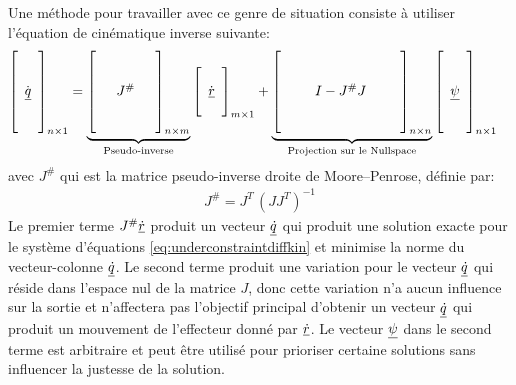 Une méthode pour travailler avec ce genre de situation consiste à utiliser l'équation de cinématique inverse suivante:
\begin{align}
\left[ \begin{array}{c}  \\ \\ \dot{\underline{q}} \\ \\ \\
\end{array} \right]_{n \times 1}
&= 
\underbrace{
\left[ \begin{array}{c c c} 
&&\\ &&\\ & J^{\#} & \\&& \\ &&
\end{array} \right]_{n \times m}
}_{\text{Pseudo-inverse}}
\left[ \begin{array}{c} 
\\ \dot{\underline{r}} \\ \\
\end{array} \right]_{m \times 1} + 
\underbrace{
\left[ \begin{array}{c c c c c} 
&&&&\\ &&&&\\ && I - J^{\#}J && \\&&&& \\ &&&&
\end{array} \right]_{n \times n}
}_{\text{Projection sur le Nullspace}}
\left[ \begin{array}{c} 
\\ \\ \underline{\psi} \\ \\ \\
\end{array} \right]_{n \times 1}
\label{eq:pseudoinversediffkin}
\end{align} 
avec $J^{\#}$ qui est la matrice pseudo-inverse droite de Moore–Penrose, définie par:
\begin{align}
J^{\#} = J^T\, (JJ^T)^{-1}
\end{align} 
Le premier terme $J^{\#} \underline{\dot{r}}$ produit un vecteur $\underline{\dot{q}}$ qui produit une solution exacte pour le système d'équations \eqref{eq:underconstraintdiffkin}
et minimise la norme du vecteur-colonne $\underline{\dot{q}}$. Le second terme produit une variation pour le vecteur $\underline{\dot{q}}$ qui réside dans l'espace nul de la matrice $J$, donc cette variation n'a aucun influence sur la sortie et n’affectera pas l'objectif principal d'obtenir un vecteur $\underline{\dot{q}}$ qui produit un mouvement de l'effecteur donné par $\underline{\dot{r}}$. Le vecteur $\underline{\psi}$ dans le second terme est arbitraire et peut être utilisé pour prioriser certaine solutions sans influencer la justesse de la solution. 


